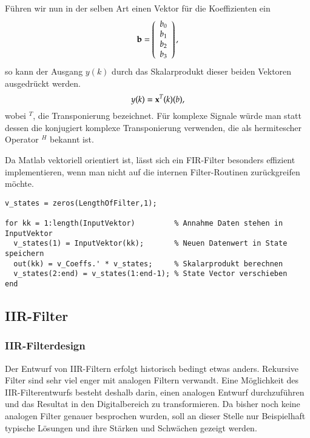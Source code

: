Führen wir nun in der selben Art einen Vektor für die Koeffizienten ein
\begin{equation}\label{ed:Def:KoeffVektor}
    \vek{b} = \left(%
\begin{array}{c}
  b_0 \\
  b_1 \\
  b_2 \\
  b_3 \\
\end{array}%
\right),
\end{equation}
so kann der Ausgang $y(k)$ durch das Skalarprodukt dieser beiden Vektoren
ausgedrückt werden.
\begin{equation}\label{eq:FIR:VEk}
    y(k) = \mathbf{x}^T(k) \mathbf{(}b),
\end{equation}
wobei $^T$, die Transponierung bezeichnet. Für komplexe Signale würde man statt dessen die konjugiert
komplexe Transponierung verwenden, die als hermitescher Operator $^H$ bekannt ist.

Da Matlab vektoriell orientiert ist, lässt sich ein FIR-Filter besonders effizient implementieren, wenn
man nicht auf die internen Filter-Routinen zurückgreifen möchte.

\begin{verbatim}
v_states = zeros(LengthOfFilter,1);

for kk = 1:length(InputVektor)         % Annahme Daten stehen in InputVektor
  v_states(1) = InputVektor(kk);       % Neuen Datenwert in State speichern
  out(kk) = v_Coeffs.' * v_states;     % Skalarprodukt berechnen
  v_states(2:end) = v_states(1:end-1); % State Vector verschieben
end
\end{verbatim}

\subsection{IIR-Filter}

\subsubsection{IIR-Filterdesign\label{sec:MatlabFilter}}
Der Entwurf von IIR-Filtern erfolgt historisch bedingt etwas anders. Rekursive Filter
sind sehr viel enger mit analogen Filtern verwandt. Eine Möglichkeit des IIR-Filterentwurfs
besteht deshalb darin, einen analogen Entwurf durchzuführen und das Resultat in den Digitalbereich
zu transformieren. Da bisher noch keine analogen Filter genauer besprochen wurden, soll an dieser Stelle
nur Beispielhaft typische Lösungen und ihre Stärken und Schwächen gezeigt werden.

